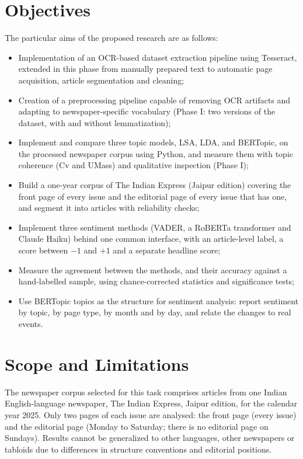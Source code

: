 \section{Objectives}

The particular aims of the proposed research are as follows:
\begin{itemize}
\item Implementation of an OCR-based dataset extraction pipeline using Tesseract, extended in this phase from manually prepared text to automatic page acquisition, article segmentation and cleaning;
\item Creation of a preprocessing pipeline capable of removing OCR artifacts and adapting to newspaper-specific vocabulary (Phase I: two versions of the dataset, with and without lemmatization);
\item Implement and compare three topic models, LSA, LDA, and BERTopic, on the processed newspaper corpus using Python, and measure them with topic coherence (Cv and UMass) and qualitative inspection (Phase I);
\item Build a one-year corpus of The Indian Express (Jaipur edition) covering the front page of every issue and the editorial page of every issue that has one, and segment it into articles with reliability checks;
\item Implement three sentiment methods (VADER, a RoBERTa transformer and Claude Haiku) behind one common interface, with an article-level label, a score between $-1$ and $+1$ and a separate headline score;
\item Measure the agreement between the methods, and their accuracy against a hand-labelled sample, using chance-corrected statistics and significance tests;
\item Use BERTopic topics as the structure for sentiment analysis: report sentiment by topic, by page type, by month and by day, and relate the changes to real events.
\end{itemize}

\section{Scope and Limitations}

The newspaper corpus selected for this task comprises articles from one Indian English-language newspaper, The Indian Express, Jaipur edition, for the calendar year 2025. Only two pages of each issue are analysed: the front page (every issue) and the editorial page (Monday to Saturday; there is no editorial page on Sundays). Results cannot be generalized to other languages, other newspapers or tabloids due to differences in structure conventions and editorial positions.

